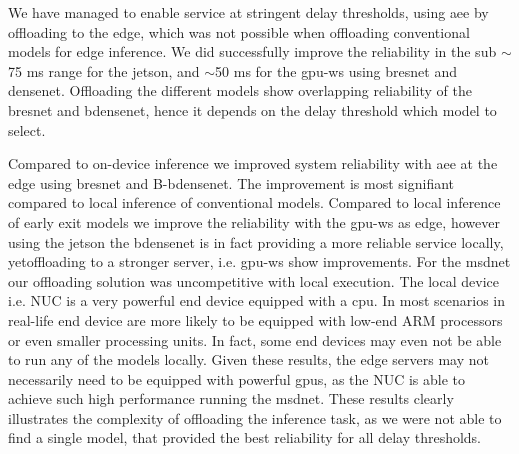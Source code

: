 We have managed to enable service at stringent delay thresholds, using \gls{aee} by offloading to the edge, which was not possible when offloading conventional models for edge inference. We did successfully improve the reliability in the sub $ \sim $75 ms range for the \gls{jetson}, and $ \sim $50 ms for the \gls{gpu-ws} using \gls{bresnet} and \gls{densenet}. Offloading the different models show overlapping reliability of the \gls{bresnet} and \gls{bdensenet}, hence it depends on the delay threshold which model to select.  

Compared to on-device inference we improved system reliability with \gls{aee} at the edge using \gls{bresnet} and B-\gls{bdensenet}. The improvement is most signifiant compared to local inference of conventional models. Compared to local inference of early exit models we improve the reliability with the \gls{gpu-ws} as edge, however using the \gls{jetson} the \gls{bdensenet} is in fact providing a more reliable service locally, yetoffloading to a stronger server, i.e. \gls{gpu-ws} show improvements. For the \gls{msdnet} our offloading solution was uncompetitive with local execution. The local device i.e. NUC is a very powerful end device equipped with a \gls{cpu}. In most scenarios in real-life end device are more likely to be equipped with low-end ARM processors or even smaller processing units. In fact, some end devices may even not be able to run any of the models locally. Given these results, the edge servers may not necessarily need to be equipped with powerful \gls{gpu}s, as the NUC is able to achieve such high performance running the \gls{msdnet}. These results clearly illustrates the complexity of offloading the inference task, as we were not able to find a single model, that provided the best reliability for all delay thresholds.

